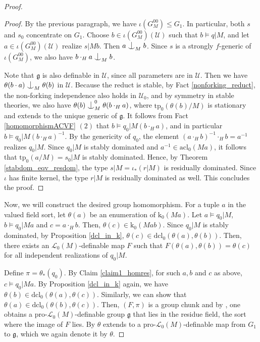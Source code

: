 \documentclass[12pt]{article}
\newcommand{\tpp}{\mathrm{tp}}
\newcommand{\acl}{\mathrm{acl}}
\newcommand{\dcl}{\mathrm{dcl}}
\newcommand{\0}{\emptyset}
\newcommand{\rf}{\mathrm{k}}
\newcommand{\U}{\mathcal{U}}
\newcommand{\Ualg}{\mathcal{U}_0}
\def\forkindep{\mathrel{\raise0.2ex\hbox{\ooalign{\hidewidth$\vert$\hidewidth\cr\raise-0.9ex\hbox{$\smile$}}}}}
\theoremstyle{plain}%
\theoremstyle{definition}
\theoremstyle{remark}
\begin{document}
\begin{proof}
\begin{proof}
     By the previous paragraph, we have $\iota(G_M^{00}) \leq G_1$. In particular, both $s$ and $s_0$ concentrate on $G_1$. Choose $b \in \iota(G_M^{00})(\U)$ such that $b \models q|M$, and let $a \in \iota(G_M^{00})(\U)$ realize $s|Mb$. Then $a \forkindep_M b$. Since $s$ is a strongly $f$-generic of $\iota(G_M^{00})$, we also have $b \cdot_H a \forkindep_M b$. 
   
   Note that $\mathfrak{g}$ is also definable in $\U$, since all parameters are in $\U$. 
   Then we have $\theta(b \cdot a) \forkindep_M \theta(b)$ in $\U$. 
   Because the reduct is stable, by Fact \ref{nonforking_reduct}, the non-forking independence also holds in $\Ualg$, and by symmetry in stable theories, we also have $\theta(b) \forkindep_M^0 \theta(b \cdot_H a)$, where $\tpp_0(\theta(b)/M)$ is stationary and extends to  the unique generic of $\mathfrak{g}$. It follows from Fact \ref{homomorphismACVF} $(2)$ that $b \models q_0|M(b \cdot_H a)$, and in particular $b \models q_0|M(b \cdot_H a)^{-1}$. By the genericity of $q_0$, the element $(a \cdot_H b)^{-1} \cdot_H b = a^{-1}$ realizes $q_0|M$. Since $q_0|M$ is stably dominated and $a^{-1} \in \acl_0(Ma)$, it follows that $\tpp_0(a/M) = s_0|M$ is stably dominated. Hence, by Theorem \ref{stabdom_eqv_resdom}, the type $s|M=\iota_*(r|M)$ is residually dominated. Since $\iota$ has finite kernel, the type $r|M$ is residually dominated as well. This concludes the proof.\end{proof}






Now, we will construct the desired group homomorphism. For a tuple $a$ in the valued field sort, let $\theta(a)$ be an enumeration of $\rf_0(Ma)$. Let  $a\models q_0|M$, $b\models q_0|Ma$ and $c = a \cdot_H b$. Then, $\theta(c) \in \rf_0(Mab)$. Since $q_0|M$ is stably dominated, by Proposition \ref{dcl_in_k}, $\theta(c) \in \dcl_0(\theta(a), \theta(b))$. Then, there exists an $\mathcal{L}_0(M)$-definable map $F$ such that $F(\theta(a),\theta(b))=\theta(c)$ for all independent realizations of $q_0|M$.

Define $\pi = \theta_{*}(q_0)$. 
By Claim \ref{claim1_homres}, for such $a,b$ and $c$ as above, $c\models q_0|Ma$. By Proposition \ref{dcl_in_k} again, we have $\theta(b)\in \dcl_0(\theta(a), \theta(c))$. Similarly, we can show that $\theta(a)\in \dcl_0(\theta(b),\theta(c))$. 
Then, $(F,
\pi)$ is a group chunk and by \cite[Proposition 3.15]{HR19}, one obtains a pro-$\mathcal{L}_0(M)$-definable group $\mathfrak{g}$ that lies in the residue field, the sort where the image of $F$ lies. 
By \cite[Proposition 3.16]{HR19} $\theta$ extends to a pro-$\mathcal{L}_0(M)$-definable map from $G_1$ to $\mathfrak{g}$, which we again denote it by $\theta$.


\end{proof}
\end{document}
